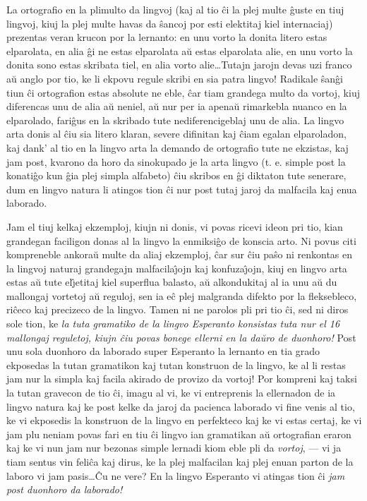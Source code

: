    La ortografio en la plimulto da lingvoj (kaj al tio \^ci la plej multe
\^guste en tiuj lingvoj, kiuj la plej multe havas da \^sancoj por
esti elektitaj kiel internaciaj) prezentas veran krucon por la
lernanto: en unu vorto la donita litero estas elparolata, en alia
\^gi ne estas elparolata a\u u estas elparolata alie, en unu vorto
la donita sono estas skribata tiel, en alia vorto alie\dots Tutajn
jarojn devas uzi franco a\u u anglo por tio, ke li ekpovu regule
skribi en sia patra lingvo! Radikale \^san\^gi tiun \^ci ortografion
estas absolute ne eble, \^car tiam grandega multo da vortoj, kiuj
diferencas unu de alia a\u u neniel, a\u u nur per ia apena\u u
rimarkebla nuanco en la elparolado, fari\^gus en la skribado tute
nediferencigeblaj unu de alia. La lingvo arta donis al \^ciu sia
litero klaran, severe difinitan kaj \^ciam egalan elparoladon, kaj
dank' al tio en la lingvo arta la demando de ortografio tute ne
ekzistas, kaj jam post, kvarono da horo da sinokupado je la arta
lingvo (t. e. simple post la konati\^go kun \^gia plej simpla
alfabeto) \^ciu skribos en \^gi diktaton tute senerare, dum en
lingvo natura li atingos tion \^ci nur post tutaj jaroj da malfacila
kaj enua laborado.

   Jam el tiuj kelkaj ekzemploj, kiujn ni donis, vi povas ricevi ideon
pri tio, kian grandegan faciligon donas al la lingvo la enmiksi\^go
de konscia arto. Ni povus citi kompreneble ankora\u u multe da aliaj
ekzemploj, \^car sur \^ciu pa\^so ni renkontas en la lingvoj naturaj
grandegajn malfacila\^{\j}ojn kaj konfuza\^{\j}ojn, kiuj en lingvo
arta estas a\u u tute el\^{\j}etitaj kiel superflua balasto, a\u u
alkondukitaj al ia unu a\u u du mallongaj vortetoj a\u u reguloj,
sen ia e\^c plej malgranda difekto por la fleksebleco, ri\^ceco kaj
precizeco de la lingvo. Tamen ni ne parolos pli pri tio \^ci, sed ni
diros sole tion, ke {\sl la tuta gramatiko de la lingvo Esperanto
konsistas tuta nur el 16 mallongaj reguletoj, kiujn \^ciu povas
bonege ellerni en la da\u uro de duonhoro!} Post unu sola duonhoro
da laborado super Esperanto la lernanto en tia grado ekposedas la
tutan gramatikon kaj tutan konstruon de la lingvo, ke al li restas
jam nur la simpla kaj facila akirado de provizo da vortoj! Por
kompreni kaj taksi la tutan gravecon de tio \^ci, imagu al vi, ke vi
entreprenis la ellernadon de ia lingvo natura kaj ke post kelke da
jaroj da pacienca laborado vi fine venis al tio, ke vi ekposedis la
konstruon de la lingvo en perfekteco kaj ke vi estas certaj, ke vi
jam plu neniam povas fari en tiu \^ci lingvo ian gramatikan a\u u
ortografian eraron kaj ke vi nun jam nur bezonas simple lernadi kiom
eble pli da {\sl vortoj}, --- vi ja tiam sentus vin feli\^ca kaj
dirus, ke la plej malfacilan kaj plej enuan parton de la laboro vi
jam pasis\dots \^Cu ne vere? En la lingvo Esperanto vi atingas tion
\^ci {\sl jam post duonhoro da laborado!}

